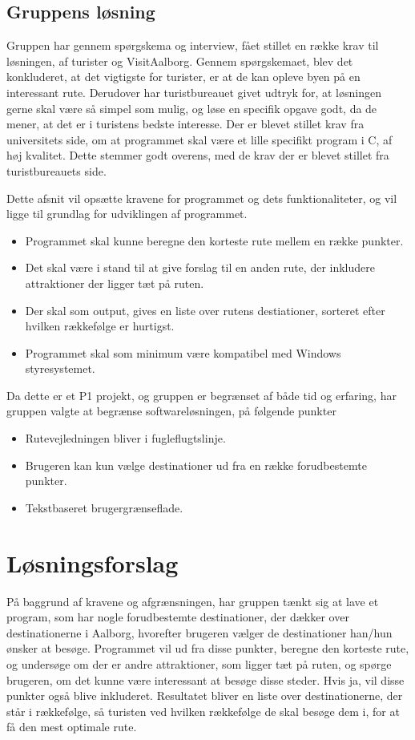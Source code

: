 \subsection{Gruppens løsning}
Gruppen har gennem spørgskema og interview, fået stillet en række krav til løsningen, af turister og VisitAalborg. 
Gennem spørgskemaet, blev det konkluderet, at det vigtigste for turister, er at de kan opleve byen på en interessant rute. 
Derudover har turistbureauet givet udtryk for, at løsningen gerne skal være så simpel som mulig, og løse en specifik opgave godt, da de mener, at det er i turistens bedste interesse. \newline
Der er blevet stillet krav fra universitets side, om at programmet skal være et lille specifikt program i C, af høj kvalitet. Dette stemmer godt overens, med de krav der er blevet stillet fra turistbureauets side.   \newline

Dette afsnit vil opsætte kravene for programmet og dets funktionaliteter, og vil ligge til grundlag for udviklingen af programmet. 

\begin{itemize}
	\item Programmet skal kunne beregne den korteste rute mellem en række punkter.
	\item Det skal være i stand til at give forslag til en anden rute, der inkludere attraktioner der ligger tæt på ruten.
 	\item Der skal som output, gives en liste over rutens destiationer, sorteret efter hvilken rækkefølge er hurtigst.
 	\item Programmet skal som minimum være kompatibel med Windows styresystemet. 
\end{itemize}

Da dette er et P1 projekt, og gruppen er begrænset af både tid og erfaring, har gruppen valgte at begrænse softwareløsningen, på følgende punkter \newline
\begin{itemize}
	\item Rutevejledningen bliver i fugleflugtslinje.
	\item Brugeren kan kun vælge destinationer ud fra en række forudbestemte punkter.
	\item Tekstbaseret brugergrænseflade.
\end{itemize}

\section{Løsningsforslag}
På baggrund af kravene og afgrænsningen, har gruppen tænkt sig at lave et program, som har nogle forudbestemte destinationer, der dækker over destinationerne i Aalborg, hvorefter brugeren vælger de destinationer han/hun ønsker at besøge. Programmet vil ud fra disse punkter, beregne den korteste rute, og undersøge om der er andre attraktioner, som ligger tæt på ruten, og spørge brugeren, om det kunne være interessant at besøge disse steder. Hvis ja, vil disse punkter også blive inkluderet. Resultatet bliver en liste over destinationerne, der står i rækkefølge, så turisten ved hvilken rækkefølge de skal besøge dem i, for at få den mest optimale rute.

